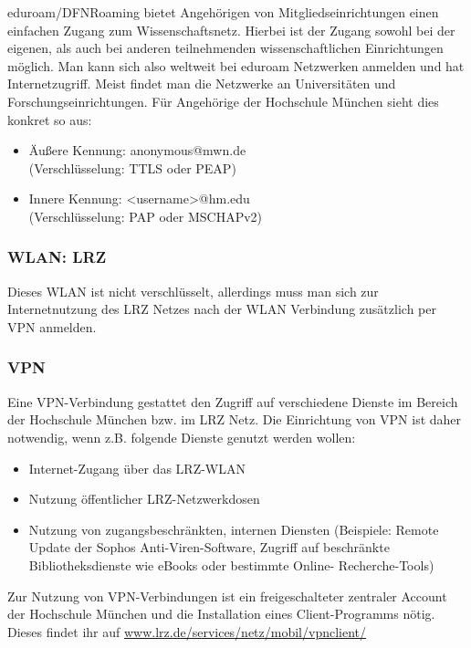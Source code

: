 eduroam/DFNRoaming bietet Angehörigen von Mitgliedseinrichtungen einen einfachen Zugang zum Wissenschaftsnetz. Hierbei ist der Zugang sowohl bei der eigenen, als auch bei anderen teilnehmenden wissenschaftlichen Einrichtungen möglich. Man kann sich also weltweit bei eduroam Netzwerken anmelden und hat Internetzugriff. Meist findet man die Netzwerke an Universitäten und Forschungseinrichtungen.\doublebreak
Für Angehörige der Hochschule München sieht dies konkret so aus:
\begin{itemize}
		 \item{Äußere Kennung: anonymous@mwn.de\\ (Verschlüsselung: TTLS oder PEAP)}
		 \item{Innere Kennung: \textless username\textgreater @hm.edu\\ (Verschlüsselung: PAP oder MSCHAPv2)}
\end{itemize}


\subsubsection{WLAN: LRZ}

Dieses WLAN ist nicht verschlüsselt, allerdings muss man sich zur Internetnutzung des LRZ Netzes nach der WLAN Verbindung zusätzlich per VPN anmelden.

\subsubsection{VPN}

Eine VPN-Verbindung gestattet den Zugriff auf verschiedene Dienste im Bereich der Hochschule München bzw. im LRZ Netz. Die Einrichtung von VPN ist daher notwendig, wenn z.B. folgende Dienste genutzt werden wollen:

\begin{itemize}
	\item{Internet-Zugang über das LRZ-WLAN}
	\item{Nutzung öffentlicher LRZ-Netzwerkdosen}
	\item{Nutzung von zugangsbeschränkten, internen Diensten (Beispiele: Remote Update der Sophos Anti-Viren-Software, Zugriff auf beschränkte Bibliotheksdienste wie eBooks oder bestimmte Online- Recherche-Tools)}
\end{itemize}
Zur Nutzung von VPN-Verbindungen ist ein freigeschalteter zentraler Account der Hochschule München und die Installation eines Client-Programms nötig. Dieses findet ihr auf \url{www.lrz.de/services/netz/mobil/vpnclient/}

